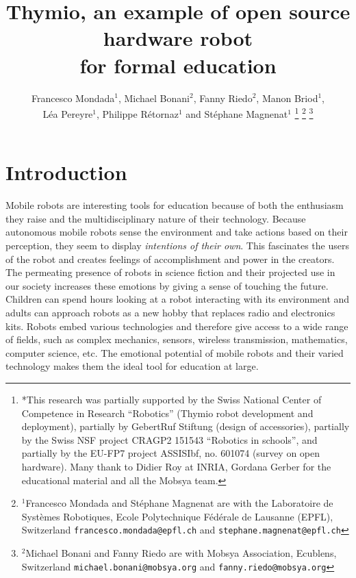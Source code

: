 \documentclass[letterpaper, 10 pt, conference]{ieeeconf}  %
\title{\LARGE \bf
Thymio, an example of open source hardware robot \\
for formal education
}
\author{Francesco Mondada$^{1}$, Michael Bonani$^{2}$, Fanny Riedo$^{2}$, Manon Briod$^{1}$, \\
L\'ea Pereyre$^{1}$, Philippe R\'etornaz$^{1}$ and St\'ephane Magnenat$^{1}$%
\thanks{*This research was partially supported by the Swiss National Center of Competence in Research ``Robotics'' (Thymio robot development and deployment), partially by GebertRuf Stiftung (design of accessories), partially by the Swiss NSF project CRAGP2 151543 ``Robotics in schools'', and partially by the EU-FP7 project ASSISIbf, no. 601074 (survey on open hardware). Many thank to Didier Roy at INRIA, Gordana Gerber for the educational material and all the Mobsya team.}%
\thanks{$^{1}$Francesco Mondada and St\'ephane Magnenat are with the Laboratoire de Syst\`emes Robotiques,
        Ecole Polytechnique F\'ed\'erale de Lausanne (EPFL), Switzerland
        {\tt\small francesco.mondada@epfl.ch} and {\tt\small stephane.magnenat@epfl.ch}}%
\thanks{$^{2}$Michael Bonani and Fanny Riedo are with Mobsya Association, Ecublens, Switzerland
        {\tt\small michael.bonani@mobsya.org} and {\tt\small fanny.riedo@mobsya.org}}%
}
\begin{document}
\maketitle
\thispagestyle{empty}
\pagestyle{empty}





\section{Introduction}

Mobile robots are interesting tools for education because of both the enthusiasm they raise and the multidisciplinary nature of their technology.
Because autonomous mobile robots sense the environment and take actions based on their perception, they seem to display \emph{intentions of their own}.
This fascinates the users of the robot and creates feelings of accomplishment and power in the creators.
The permeating presence of robots in science fiction and their projected use in our society increases these emotions by giving a sense of touching the future. %
Children can spend hours looking at a robot interacting with its environment and adults can approach robots as a new hobby that replaces radio and electronics kits.
Robots embed various technologies and therefore give access to a wide range of fields, such as complex mechanics, sensors, wireless transmission, mathematics, computer science, etc.
The emotional potential of mobile robots and their varied technology makes them the ideal tool for education at large.
\end{document}
